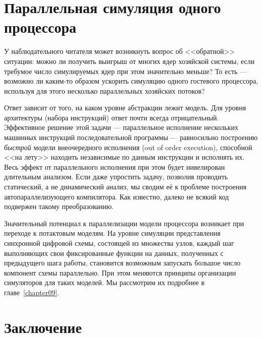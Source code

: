 % 
% 


\section{Параллельная симуляция одного процессора}

У наблюдательного читателя может возникнуть вопрос об <<обратной>> ситуации: можно ли получить выигрыш от многих ядер хозяйской системы, если требумое число симулируемых ядер при этом значительно меньше?  То есть --- возможно ли каким-то образом ускорить симуляцию одного гостевого процессора, используя для этого несколько параллельных хозяйских потоков? 

Ответ зависит от того, на каком уровне абстракции лежит модель. Для уровня архитектуры (набора инструкций) ответ почти всегда отрицательный. Эффективное решение этой задачи --- параллельное исполнение нескольких машинных инструкций последовательной программы --- равносильно построению \textit{быстрой} модели внеочередного исполнения (\abbr out of order execution), способной <<на лету>> находить независимые по данным инструкции и исполнять их. Весь эффект от параллельного исполнения при этом будет нивелирован длительным анализом. Если даже упростить задачу, позволив проводить статический, а не динамический анализ, мы сводим её к проблеме построения автопараллелизующего компилятора. Как известно, далеко не всякий код подвержен такому преобразованию.

Значительный потенциал к параллелизации модели процессора возникает при переходе к потактовым моделям. На уровне симуляции представления синхронной цифровой схемы, состоящей из множества узлов, каждый шаг выполняющих свои фиксированные функции на данных, полученных с предыдущего шага работы, становится возможным запускать большое число компонент схемы параллельно. При этом меняются принципы организации симуляторов для таких моделей. Мы рассмотрим их подробнее в главе~\ref{chapter09}.

\section{Заключение}

